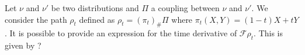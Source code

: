 Let $  \nu$ and $\nu'$ be two distributions and $\Pi$ a coupling between $\nu$ and $\nu'$. We consider the path $\rho_t$ defined as $\rho_t=(\pi_t)_{\#}\Pi$ where $\pi_t(X,Y)=(1-t)X+tY$. It is possible to provide an expression for the time derivative of $\mathcal{F}{\rho_t}$. This is given by ?\\





